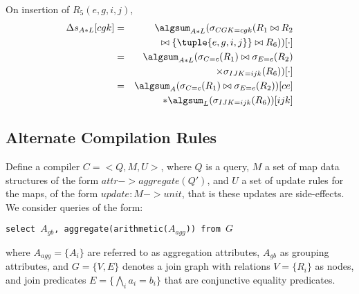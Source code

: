 {\begin{example}
On insertion of $R_5(e,g,i,j)$,
\begin{eqnarray*}
\Delta s_{A*L}[cgk]
&=&
\algsum_{A*L}(\sigma_{CGK=cgk}(R_1 \bowtie R_2 \\
&& \quad \bowtie \{\tuple{e,g,i,j}\} \bowtie R_6))[\cdot]
\\
&=&
\algsum_{A*L}(\sigma_{C=c}(R_1) \bowtie \sigma_{E=e}(R_2) \\
&& \quad \times \sigma_{IJK=ijk}(R_6))[\cdot]
\\
&=&
\algsum_{A}(\sigma_{C=c}(R_1) \bowtie \sigma_{E=e}(R_2))[ce] \\
&& \quad * \algsum_L(\sigma_{IJK=ijk}(R_6))[ijk]
\end{eqnarray*}
\punto
\end{example}



} %


























\subsection{Alternate Compilation Rules}
Define a compiler $C = <Q, M, U>$, where $Q$ is a query, $M$ a set of map data
structures of the form ${attr}->aggregate(Q')$, and $U$ a set of update rules
for the maps, of the form $update: M -> unit$, that is these updates are
side-effects. We consider queries of the form:

\begin{center}
\texttt{select $A_{gb}$, aggregate(arithmetic($A_{agg}$)) from $G$}
\end{center}

where $A_{agg} = \{A_i\}$ are referred to as aggregation attributes, $A_{gb}$ as
grouping attributes, and $G=\{V,E\}$ denotes a join graph with relations
$V=\{R_i\}$ as nodes, and join predicates $E=\{\bigwedge_{i} a_i=b_i\}$ that are
conjunctive equality predicates.

